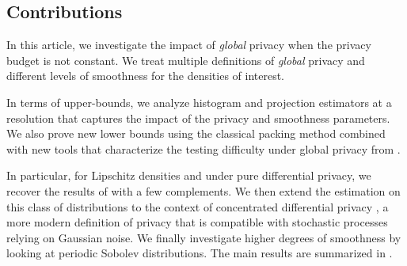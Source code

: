 \documentclass[10pt]{article} %
\begin{document}

\subsection{Contributions}

In this article, we investigate the impact of \emph{global} privacy when the privacy budget is not constant. We treat multiple definitions of \emph{global} privacy and different levels of smoothness for the densities of interest. 

In terms of upper-bounds, we analyze histogram and projection estimators at a resolution that captures the impact of the privacy and smoothness parameters. We also prove new lower bounds using the classical packing method combined with new tools that characterize the testing difficulty under global privacy from \citet{acharya2021differentially,kamath2022improved,lalanne2022statistical}.

In particular, for Lipschitz densities and under pure differential privacy, we recover the results of \citet{barber2014privacy} with a few complements. 
We then extend the estimation on this class of distributions to the context of concentrated differential privacy \citep{bun2016concentrated}, a more modern definition of privacy that is compatible with stochastic processes relying on Gaussian noise. We finally investigate higher degrees of smoothness by looking at periodic Sobolev distributions.
The main results are summarized in .
\end{document}
